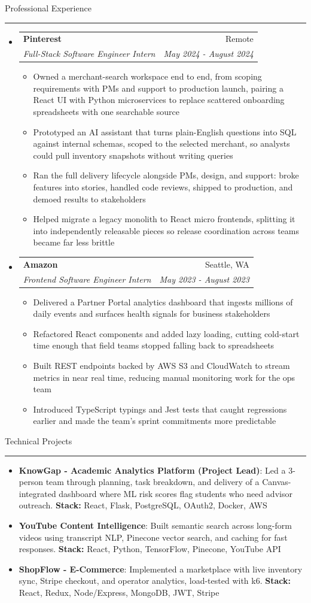 \documentclass[a4paper,10pt]{article}
\makeatletter
\newcommand{\ressection}[1]{%
  \vspace{6pt}%
  {\large\scshape\raggedright #1}%
  \vspace{2pt}%
  \hrule%
  \vspace{3pt}%
}
\newcommand{\resumeItem}[2]{
  \item{\small\textbf{#1}{: #2}}
}
\newcommand{\resumeItemWithoutTitle}[1]{
  \item{\small{#1}}
}
\newcommand{\resumeSubheading}[4]{
  \vspace{-1pt}\item
    \begin{tabular*}{0.96\textwidth}[t]{l@{\extracolsep{\fill}}r}
      \textbf{#1} & #2 \\
      \textit{\small#3} & \textit{\small #4} \\
    \end{tabular*}\vspace{-2pt}
}
\newcommand{\resumeSubItem}[2]{\resumeItem{#1}{#2}}
\newenvironment{resumeSubHeadingList}{\begin{itemize}\setlength{\itemsep}{2pt}\setlength{\parskip}{0pt}\setlength{\leftmargin}{0em}\setlength{\labelsep}{0pt}\renewcommand{\labelitemi}{}}{\end{itemize}}
\newenvironment{resumeItemList}{\begin{itemize}\setlength{\itemsep}{1pt}\setlength{\parsep}{0pt}\setlength{\leftmargin}{1em}}{\end{itemize}\vspace{-2pt}}
\makeatother
\begin{document}
\ressection{Professional Experience}
\begin{resumeSubHeadingList}
		\resumeSubheading{Pinterest}{Remote}
			{Full-Stack Software Engineer Intern}{May 2024 - August 2024}
			\begin{resumeItemList}
			  \resumeItemWithoutTitle{Owned a merchant-search workspace end to end, from scoping requirements with PMs and support to production launch, pairing a React UI with Python microservices to replace scattered onboarding spreadsheets with one searchable source}
			  \resumeItemWithoutTitle{Prototyped an AI assistant that turns plain-English questions into SQL against internal schemas, scoped to the selected merchant, so analysts could pull inventory snapshots without writing queries}
			  \resumeItemWithoutTitle{Ran the full delivery lifecycle alongside PMs, design, and support: broke features into stories, handled code reviews, shipped to production, and demoed results to stakeholders}
			  \resumeItemWithoutTitle{Helped migrate a legacy monolith to React micro frontends, splitting it into independently releasable pieces so release coordination across teams became far less brittle}
			\end{resumeItemList}
		\resumeSubheading{Amazon}{Seattle, WA}
			{Frontend Software Engineer Intern}{May 2023 - August 2023}
			\begin{resumeItemList}
			  \resumeItemWithoutTitle{Delivered a Partner Portal analytics dashboard that ingests millions of daily events and surfaces health signals for business stakeholders}
			  \resumeItemWithoutTitle{Refactored React components and added lazy loading, cutting cold-start time enough that field teams stopped falling back to spreadsheets}
			  \resumeItemWithoutTitle{Built REST endpoints backed by AWS S3 and CloudWatch to stream metrics in near real time, reducing manual monitoring work for the ops team}
			  \resumeItemWithoutTitle{Introduced TypeScript typings and Jest tests that caught regressions earlier and made the team's sprint commitments more predictable}
			\end{resumeItemList}
\end{resumeSubHeadingList}

\ressection{Technical Projects}
\begin{resumeSubHeadingList}
	\resumeSubItem{KnowGap - Academic Analytics Platform (Project Lead)}{Led a 3-person team through planning, task breakdown, and delivery of a Canvas-integrated dashboard where ML risk scores flag students who need advisor outreach. \textbf{Stack:} React, Flask, PostgreSQL, OAuth2, Docker, AWS}
	\resumeSubItem{YouTube Content Intelligence}{Built semantic search across long-form videos using transcript NLP, Pinecone vector search, and caching for fast responses. \textbf{Stack:} React, Python, TensorFlow, Pinecone, YouTube API}
	\resumeSubItem{ShopFlow - E-Commerce}{Implemented a marketplace with live inventory sync, Stripe checkout, and operator analytics, load-tested with k6. \textbf{Stack:} React, Redux, Node/Express, MongoDB, JWT, Stripe}
\end{resumeSubHeadingList}
\end{document}

